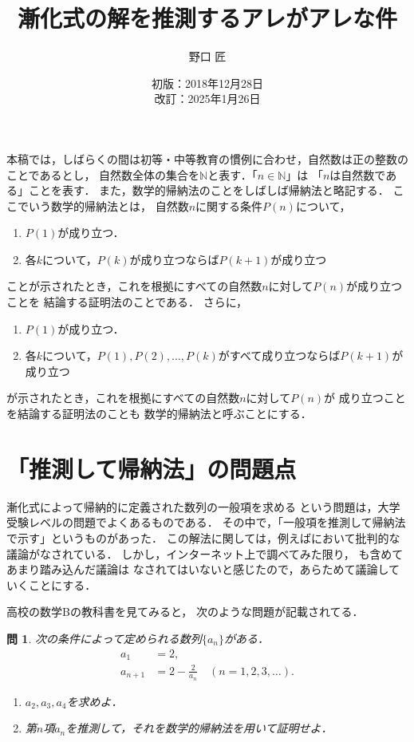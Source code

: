 \documentclass[11pt,a4paper]{ltjsarticle} %
\title{漸化式の解を推測するアレがアレな件}
\author{野口 匠}
\date{初版：2018年12月28日 \\
改訂：2025年1月26日}
\theoremstyle{mystyle} %
\newtheorem{que}{問} %
\begin{document}
%
\maketitle

本稿では，しばらくの間は初等・中等教育の慣例に合わせ，自然数は正の整数のことであるとし，
自然数全体の集合を$\mathbb{N}$と表す．「$n \in \mathbb{N}$」は
「$n$は自然数である」ことを表す．
また，数学的帰納法のことをしばしば帰納法と略記する．
ここでいう数学的帰納法とは，
自然数$n$に関する条件$P(n)$について，
\begin{enumerate}
	\item $P(1)$が成り立つ．
	\item 各$k$について，$P(k)$が成り立つならば$P(k+1)$が成り立つ
\end{enumerate}
ことが示されたとき，これを根拠にすべての自然数$n$に対して$P(n)$が成り立つことを
結論する証明法のことである．
さらに，
\begin{enumerate}
	\item $P(1)$が成り立つ．
	\item 各$k$について，$P(1),P(2),\ldots, P(k)$がすべて成り立つならば$P(k+1)$が成り立つ
\end{enumerate}
が示されたとき，これを根拠にすべての自然数$n$に対して$P(n)$が
成り立つことを結論する証明法のことも
数学的帰納法と呼ぶことにする．

%

\section{「推測して帰納法」の問題点}


漸化式によって帰納的に定義された数列の一般項を求める
という問題は，大学受験レベルの問題でよくあるものである．
その中で，「一般項を推測して帰納法で示す」というものがあった．
この解法に関しては，例えば\cite{izumi}において批判的な議論がなされている．
しかし，インターネット上で調べてみた限り，
\cite{izumi}も含めてあまり踏み込んだ議論は
なされてはいないと感じたので，あらためて議論していくことにする．


高校の数学Bの教科書\cite{kyoukasyo}を見てみると，
次のような問題が記載されてる．

\begin{que} \label{que:suisoku}
	次の条件によって定められる数列$\{ a_n \}$がある．
	\begin{align*}
		a_1     & = 2 ,                                          \\
		a_{n+1} & = 2- \frac{2}{a_n} \quad ( n = 1,2,3, \ldots).
	\end{align*}
	\begin{enumerate}
		\item $a_2,a_3,a_4$を求めよ．
		\item 第$n$項$a_n$を推測して，それを数学的帰納法を用いて証明せよ．
	\end{enumerate}
\end{que}
\end{document}
